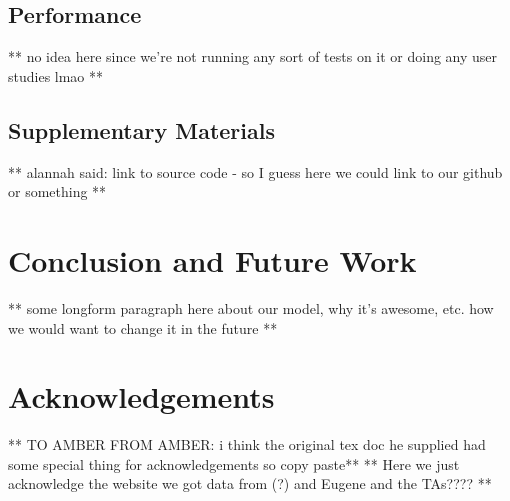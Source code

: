 \documentclass[journal]{vgtc}                %
\begin{document}
\subsection{Performance}

** no idea here since we're not running any sort of tests on it or doing any user studies lmao **

\subsection{Supplementary Materials}
** alannah said: link to source code - so I guess here we could link to our github or something **

\section{Conclusion and Future Work}

** some longform paragraph here about our model, why it's awesome, etc. how we would want to change it in the future **

\section{Acknowledgements}

** TO AMBER FROM AMBER: i think the original tex doc he supplied had some special thing for acknowledgements so copy paste**
** Here we just acknowledge the website we got data from (?) and Eugene and the TAs???? **
\end{document}
